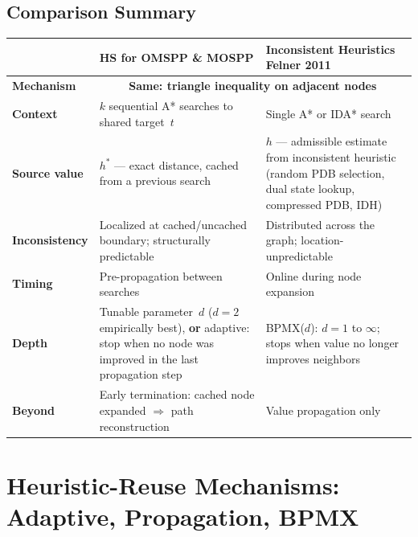 \documentclass[11pt, a4paper]{article}
\newcommand{\tagfelner}{%
    {\footnotesize\colorbox{felnerbg}{%
    \textcolor{felner}{\textsf{\textbf{Felner 2011}}}}}%
}
\begin{document}
\vspace{8pt}

\subsection{Comparison Summary}

\vspace{4pt}

\begin{table}[H]
\centering
\renewcommand{\arraystretch}{1.6}
\begin{tabular}{l p{4.8cm} p{4.8cm}}
\toprule
& \textbf{HS for OMSPP \& MOSPP}
& \textbf{Inconsistent Heuristics}
  \;\tagfelner \\
\midrule
\rowcolor{accentblue!25}
\textbf{Mechanism}
    & \multicolumn{2}{c}{\textbf{Same: triangle
      inequality on adjacent nodes}} \\
\textbf{Context}
    & $k$ sequential A* searches to
      shared target~$t$
    & Single A* or IDA* search \\
\rowcolor{black!5}
\textbf{Source value}
    & $h^*$ --- exact distance, cached
      from a previous search
    & $h$ --- admissible estimate from
      inconsistent heuristic (random PDB
      selection, dual state lookup,
      compressed PDB, IDH) \\
\textbf{Inconsistency}
    & Localized at cached/uncached
      boundary; structurally predictable
    & Distributed across the graph;
      location-unpredictable \\
\rowcolor{black!5}
\textbf{Timing}
    & Pre-propagation between searches
    & Online during node expansion \\
\textbf{Depth}
    & Tunable parameter~$d$
      ($d\!=\!2$ empirically best),
      \textbf{or} adaptive: stop when no
      node was improved in the last
      propagation step
    & BPMX($d$): $d\!=\!1$ to $\infty$;
      stops when value no longer improves
      neighbors \\
\rowcolor{black!5}
\textbf{Beyond}
    & Early termination: cached node
      expanded $\Rightarrow$ path
      reconstruction
    & Value propagation only \\
\bottomrule
\end{tabular}
\end{table}

\vspace{8pt}
\section{Heuristic-Reuse Mechanisms: Adaptive, Propagation, BPMX}
\end{document}
